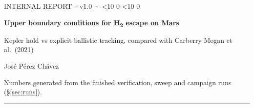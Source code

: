 \documentclass[10pt]{article}
\newcommand{\twodigit}[1]{\ifnum#1<10 0\fi\number#1}
\newcommand{\reportdate}{\number\year-\twodigit{\month}-\twodigit{\day}}
\newcommand{\Htwo}{H\textsubscript{2}}
\begin{document}
\color{charcoal}

\thispagestyle{plain}
\begin{flushleft}
{\footnotesize\ttfamily\color{grey}INTERNAL REPORT \enspace·\enspace v1.0 \enspace·\enspace \reportdate}\par
\vspace{10pt}
{\fontsize{19}{23}\selectfont\bfseries Upper boundary conditions for \Htwo{} escape on Mars\par}
\vspace{3pt}
{\fontsize{12.5}{16}\selectfont\color{graphite} Kepler hold vs explicit ballistic tracking, compared with Carberry Mogan et al.\ (2021)\par}
\vspace{8pt}
{\small José Pérez Chávez}\par
\vspace{2pt}
{\footnotesize\color{grey}Numbers generated \generatedOn{} from the finished verification, sweep and campaign runs (\S\ref{sec:runs}).}\par
\vspace{2pt}
{\color{rulegrey}\rule{\textwidth}{0.6pt}}
\end{flushleft}
\end{document}

